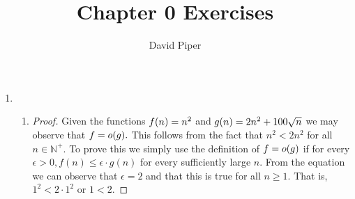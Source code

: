 \documentclass[12pt]{article}
\title{Chapter 0 Exercises}
\author{David Piper}
\begin{document}
  \maketitle

  \begin{enumerate}[label=0.\arabic*]
    \item
      \begin{enumerate}[label=(\alph*)]
        \item \begin{proof}
                Given the functions $f\qty(n)=n^2$ and $g\qty(n)=2n^2+100\sqrt{n}$ we may
                observe that $f=o\qty(g).$ This follows from the fact that $n^2 < 2n^2$
                for all $n \in \mathbb{N}^+.$ To prove this we simply use the definition
                of $f=o\qty(g)$ if for every $\epsilon > 0, f(n) \leq \epsilon \cdot g(n)$
                for every sufficiently large $n.$ From the equation we can observe that $\epsilon=2$
                and that this is true for all $n \geq 1.$ That is, $1^2 < 2 \cdot 1^2$ or
                $1 < 2.$
        \end{proof}
      \end{enumerate}
  \end{enumerate}
\end{document}
